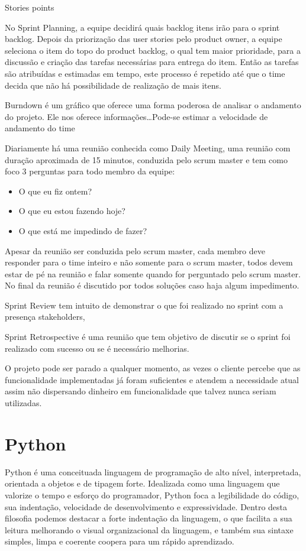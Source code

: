 \documentclass{abnt}
\begin{document}
		Stories points
		
		No Sprint Planning, a equipe decidirá quais backlog itens irão para o sprint backlog. Depois da priorização das user
		stories pelo product owner, a equipe seleciona o item do topo do product backlog, o qual tem maior prioridade, para a
		discussão e criação das tarefas necessárias para entrega do item. Então as tarefas são atribuídas e estimadas em
		tempo, este processo é repetido até que o time decida que não há possibilidade de realização de mais itens.
		
				
		Burndown é um gráfico que oferece uma forma poderosa de analisar o andamento do projeto. Ele nos oferece
		informações\ldots Pode-se estimar a velocidade de andamento do time
		
		Diariamente há uma reunião conhecida como Daily Meeting, uma reunião com duração aproximada de 15 minutos,
		conduzida pelo scrum master e tem como foco 3 perguntas para todo membro da equipe:
			\begin{itemize}
				\item O que eu fiz ontem?
				\item O que eu estou fazendo hoje?
				\item O que está me impedindo de fazer?
			\end{itemize}
		
		Apesar da reunião ser conduzida pelo scrum master, cada membro deve responder para o time inteiro e não somente para o
		scrum master, todos devem estar de pé na reunião e falar somente quando for perguntado pelo scrum master. No final da
		reunião é discutido por todos soluções caso haja algum impedimento.
		
		Sprint Review tem intuito de demonstrar o que foi realizado no sprint com a presença stakeholders, 
		
		Sprint Retrospective é uma reunião que tem objetivo de discutir se o sprint foi realizado com sucesso ou se é
		necessário melhorias.
		
		O projeto pode ser parado a qualquer momento, as vezes o cliente percebe que as funcionalidade implementadas já foram
		suficientes e atendem a necessidade atual assim não dispersando dinheiro em funcionalidade que talvez nunca seriam
		utilizadas.
	
	\section{Python}
	
		Python é uma conceituada linguagem de programação de alto nível, interpretada, orientada a objetos e de tipagem forte. Idealizada como uma linguagem que valorize o tempo e esforço do programador, Python foca a legibilidade do código, sua indentação, velocidade de desenvolvimento e expressividade. Dentro desta filosofia 
		podemos destacar a forte indentação da linguagem, o que facilita a sua leitura melhorando o visual organizacional da linguagem, e também sua sintaxe simples, limpa e coerente coopera para um rápido aprendizado.
	
\end{document}
